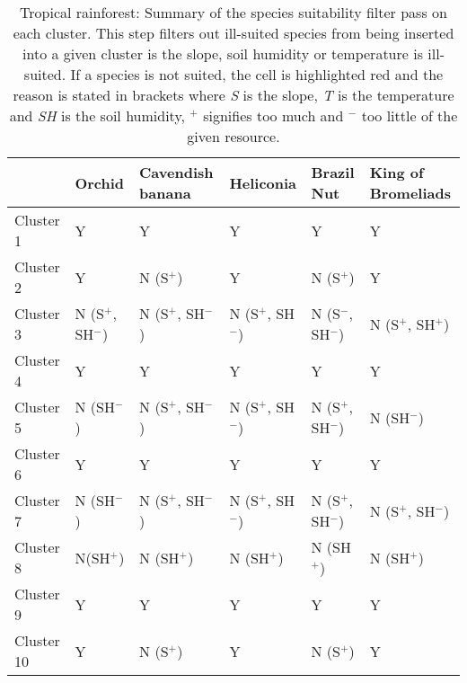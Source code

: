 \begin{table}[htb!]
  \centering
	    \begin{tabular}{|p{2cm}|p{2.5cm}|p{2.5cm}|p{2.5cm}|p{2.5cm}|p{2.5cm}|}
		\hline	
		&  \textbf{Orchid} & \textbf{Cavendish banana} & \textbf{Heliconia} & \textbf{Brazil Nut} & \textbf{King of Bromeliads}\\
		\hline	
		Cluster 1 & 
		Y & 
		Y & 
		Y & 
		Y & 
		Y \\
		\hline	
		Cluster 2 & 
		Y & 
		\cellcolor{color_red}N (S$^{+}$) & 
		Y & 
		\cellcolor{color_red}N (S$^{+}$) & 
		Y \\
		\hline	
		Cluster 3 & 
		\cellcolor{color_red}N (S$^{+}$, SH$^{-}$) & 
		\cellcolor{color_red}N (S$^{+}$, SH$^{-}$) & 
		\cellcolor{color_red}N (S$^{+}$, SH$^{-}$) & 
		\cellcolor{color_red}N (S$^{-}$, SH$^{-}$) & 
		\cellcolor{color_red}N (S$^{+}$, SH$^{+}$) \\
		\hline	
		Cluster 4 & 
		Y & 
		Y & 
		Y & 
		Y & 
		Y \\
		\hline	
		Cluster 5 & 
		\cellcolor{color_red}N (SH$^{-}$) & 
		\cellcolor{color_red}N (S$^{+}$, SH$^{-}$) & 
		\cellcolor{color_red}N (S$^{+}$, SH$^{-}$) & 
		\cellcolor{color_red}N (S$^{+}$, SH$^{-}$) & 
		\cellcolor{color_red}N (SH$^{-}$) \\
		\hline	
		Cluster 6 & 
		Y & 
		Y & 
		Y & 
		Y &
		Y \\
		\hline	
		Cluster 7 & 
		\cellcolor{color_red}N (SH$^{-}$) &
		\cellcolor{color_red}N (S$^{+}$, SH$^{-}$) &
		\cellcolor{color_red}N (S$^{+}$, SH$^{-}$) & 
		\cellcolor{color_red}N (S$^{+}$, SH$^{-}$) & 
		\cellcolor{color_red}N (S$^{+}$, SH$^{-}$) \\
		\hline	
		Cluster 8 & 
		\cellcolor{color_red}N(SH$^{+}$) & 
		\cellcolor{color_red}N (SH$^{+}$) & 
		\cellcolor{color_red}N (SH$^{+}$) & 
		\cellcolor{color_red}N (SH$^{+}$) & 
		\cellcolor{color_red}N (SH$^{+}$) \\
		\hline	
		Cluster 9 & 
		Y & 
		Y & 
		Y & 
		Y & 
		Y \\
		\hline	
		Cluster 10 &
		Y & 
		\cellcolor{color_red}N (S$^{+}$) & 
		Y & 
		\cellcolor{color_red}N (S$^{+}$) & 
		Y \\
		\hline	
		\end{tabular}
		\caption{Tropical rainforest: Summary of the species suitability filter pass on each cluster. This step filters out ill-suited species from being inserted into a given cluster is the slope, soil humidity or temperature is ill-suited. If a species is not suited, the cell is highlighted red and the reason is stated in brackets where \textit{S} is the slope, \textit{T} is the temperature and \textit{SH} is the soil humidity, $^{+}$ signifies too much and $^{-}$ too little of the given resource.}
	  \label{tab:results_tropical_species_suitability}
\end{table}

